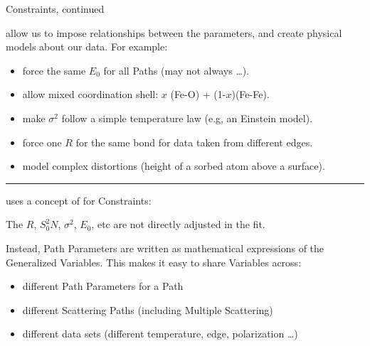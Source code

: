 \begin{slide}{Constraints, continued}
    
    {} allow us to impose relationships between the
    parameters, and create physical models about our data.  For example: 

    \begin{itemize} 
    \item force the same $E_0$ for all Paths (may not always \ldots).
      
    \item allow mixed coordination shell: $x$ (Fe-O) + (1-$x$)(Fe-Fe).
      
    \item make $\sigma^2$ follow a simple temperature law (e.g,  an
      Einstein model).
      
    \item force one $R$ for the same bond for data taken from different
      edges.

    \item model complex distortions (height of a sorbed atom above a surface).

    \end{itemize}
  
    \hrule \vmm \vmm \vmm

    {\ifeffit} uses a concept of {} for
    Constraints: 

    \vmm\vmm


    The {} $R$, $S_0^2 N$, $\sigma^2$, $E_0$, etc
    are not directly adjusted in the fit.  

    \vmm
    Instead, Path Parameters are written as mathematical expressions of the
    Generalized Variables.
    This makes it easy to share Variables across:

    \begin{itemize}
    \item different Path Parameters for a Path
    \item different Scattering Paths (including Multiple Scattering)
    \item different data sets (different temperature, edge, polarization 
      \ldots)
    \end{itemize}
      

\vfill
\end{slide} 

